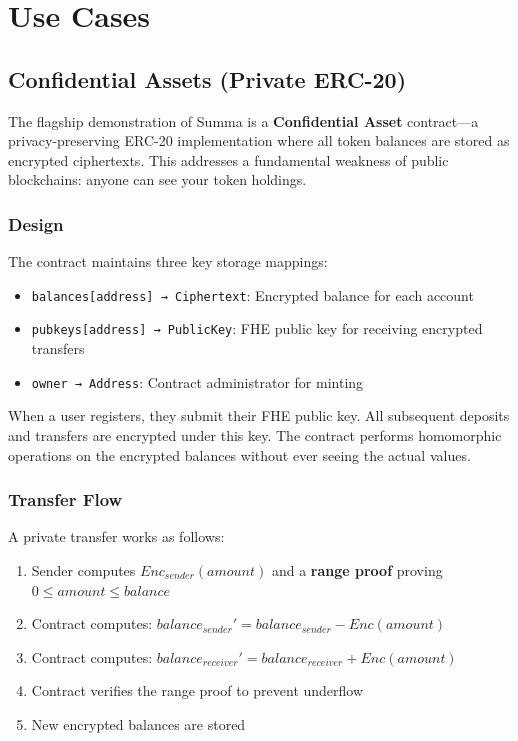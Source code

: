 \documentclass[11pt,a4paper]{article}
\begin{document}
\section{Use Cases}

\subsection{Confidential Assets (Private ERC-20)}
The flagship demonstration of Summa is a \textbf{Confidential Asset} contract---a privacy-preserving ERC-20 implementation where all token balances are stored as encrypted ciphertexts. This addresses a fundamental weakness of public blockchains: anyone can see your token holdings.

\subsubsection{Design}
The contract maintains three key storage mappings:
\begin{itemize}
    \item \texttt{balances[address] → Ciphertext}: Encrypted balance for each account
    \item \texttt{pubkeys[address] → PublicKey}: FHE public key for receiving encrypted transfers
    \item \texttt{owner → Address}: Contract administrator for minting
\end{itemize}

When a user registers, they submit their FHE public key. All subsequent deposits and transfers are encrypted under this key. The contract performs homomorphic operations on the encrypted balances without ever seeing the actual values.

\subsubsection{Transfer Flow}
A private transfer works as follows:
\begin{enumerate}
    \item Sender computes $Enc_{sender}(amount)$ and a \textbf{range proof} proving $0 \leq amount \leq balance$
    \item Contract computes: $balance_{sender}' = balance_{sender} - Enc(amount)$
    \item Contract computes: $balance_{receiver}' = balance_{receiver} + Enc(amount)$
    \item Contract verifies the range proof to prevent underflow
    \item New encrypted balances are stored
\end{enumerate}
\end{document}
